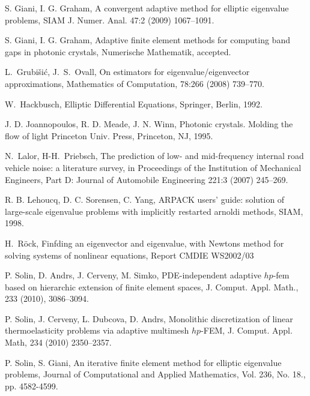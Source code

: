 \documentclass[smallextended]{svjour3}
\begin{document}
\begin{thebibliography}{10}
{\sc S. Giani, I. G. Graham,}
 { A convergent adaptive method for elliptic eigenvalue problems},
{ SIAM J. Numer. Anal.} 47:2 (2009)  1067--1091.

{\sc S. Giani, I. G. Graham,}
{ Adaptive finite element methods for computing band
gaps in photonic crystals},
{Numerische Mathematik}, accepted.

{\sc L.~Grubi\v{s}i\'c, J.~S.~Ovall},
{ On estimators for eigenvalue/eigenvector approximations},
{ Mathematics of Computation}, 78:266 (2008)  739--770.

{\sc W.~Hackbusch,}
 { Elliptic Differential Equations},
 Springer, Berlin, 1992.

{\sc J. D. Joannopoulos, R. D. Meade,  J. N. Winn, }
{ Photonic crystals. Molding the flow of light} 
{Princeton
Univ. Press, Princeton, NJ}, 1995.

{\sc N.~Lalor, H-H.~Priebsch,}
	 { The prediction of low- and mid-frequency internal road vehicle noise: a literature survey},
	{in Proceedings of the Institution of Mechanical Engineers, Part D: Journal of Automobile Engineering} 
	221:3 (2007)  245--269.

{\sc R. B. Lehoucq, D. C. Sorensen, C. Yang, }
{ ARPACK
users' guide: solution of large-scale eigenvalue problems with
implicitly restarted arnoldi methods},  {SIAM, 1998}.

{\sc H.~R\"{o}ck,}
{ Finfding an eigenvector and eigenvalue, with Newtons method for solving systems of nonlinear equations},
{Report CMDIE WS2002/03}


{\sc P. Solin, D. Andrs, J. Cerveny, M. Simko,}
{ PDE-independent adaptive $hp$-fem based on hierarchic extension of finite element spaces},
{J. Comput. Appl. Math.}, 233 (2010),  3086--3094.

{\sc P. Solin, J. Cerveny, L. Dubcova, D. Andrs,}
{ Monolithic discretization of linear 
thermoelasticity problems via adaptive multimesh $hp$-FEM}, 
{J. Comput. Appl. Math},
234 (2010)  2350--2357.

{\sc P. Solin, S. Giani,} 
{An iterative finite element method for elliptic eigenvalue problems}, 
Journal of Computational and Applied Mathematics, Vol. 236, No. 18., pp. 4582-4599.


\end{thebibliography}
\end{document}
